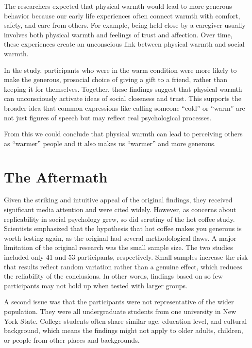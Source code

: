 \documentclass[
  letterpaper,
]{book}
\begin{document}
The researchers expected that physical warmth would lead to more
generous behavior because our early life experiences often connect
warmth with comfort, safety, and care from others. For example, being
held close by a caregiver usually involves both physical warmth and
feelings of trust and affection. Over time, these experiences create an
unconscious link between physical warmth and social warmth.

In the study, participants who were in the warm condition were more
likely to make the generous, prosocial choice of giving a gift to a
friend, rather than keeping it for themselves. Together, these findings
suggest that physical warmth can unconsciously activate ideas of social
closeness and trust. This supports the broader idea that common
expressions like calling someone ``cold'' or ``warm'' are not just
figures of speech but may reflect real psychological processes.

From this we could conclude that physical warmth can lead to perceiving
others as ``warmer'' people and it also makes us ``warmer'' and more
generous.

\section{The Aftermath}\label{the-aftermath-24}

Given the striking and intuitive appeal of the original findings, they
received significant media attention and were cited widely. However, as
concerns about replicability in social psychology grew, so did scrutiny
of the hot coffee study. Scientists emphasized that the hypothesis that
hot coffee makes you generous is worth testing again, as the original
had several methodological flaws. A major limitation of the original
research was the small sample size. The two studies included only 41 and
53 participants, respectively. Small samples increase the risk that
results reflect random variation rather than a genuine effect, which
reduces the reliability of the conclusions. In other words, findings
based on so few participants may not hold up when tested with larger
groups.

A second issue was that the participants were not representative of the
wider population. They were all undergraduate students from one
university in New York State. College students often share similar age,
education level, and cultural background, which means the findings might
not apply to older adults, children, or people from other places and
backgrounds.
\end{document}
